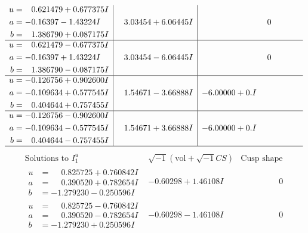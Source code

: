 \documentclass[1p]{elsarticle_modified}
\theoremstyle{definition}
\newcommand{\I}{\sqrt{-1}}
\begin{document}
$$\begin{array}{c|c|c}
\begin{aligned}
u &= \phantom{-}0.621479 + 0.677375 I \\
a &= -0.16397 - 1.43224 I \\
b &= \phantom{-}1.386790 + 0.087175 I\end{aligned}
 & \phantom{-}3.03454 + 6.06445 I & \phantom{-0.000000 } 0 \\ \hline\begin{aligned}
u &= \phantom{-}0.621479 - 0.677375 I \\
a &= -0.16397 + 1.43224 I \\
b &= \phantom{-}1.386790 - 0.087175 I\end{aligned}
 & \phantom{-}3.03454 - 6.06445 I & \phantom{-0.000000 } 0 \\ \hline\begin{aligned}
u &= -0.126756 + 0.902600 I \\
a &= -0.109634 + 0.577545 I \\
b &= \phantom{-}0.404644 + 0.757455 I\end{aligned}
 & \phantom{-}1.54671 - 3.66888 I & -6.00000 + 0. I\phantom{ +0.000000I} \\ \hline\begin{aligned}
u &= -0.126756 - 0.902600 I \\
a &= -0.109634 - 0.577545 I \\
b &= \phantom{-}0.404644 - 0.757455 I\end{aligned}
 & \phantom{-}1.54671 + 3.66888 I & -6.00000 + 0. I\phantom{ +0.000000I}\\
 \hline 
 \end{array}$$\newpage$$\begin{array}{c|c|c}  
\text{Solutions to }I^u_{1}& \I (\text{vol} + \sqrt{-1}CS) & \text{Cusp shape}\\
 \hline 
\begin{aligned}
u &= \phantom{-}0.825725 + 0.760842 I \\
a &= \phantom{-}0.390520 + 0.782654 I \\
b &= -1.279230 - 0.250596 I\end{aligned}
 & -0.60298 + 1.46108 I & \phantom{-0.000000 } 0 \\ \hline\begin{aligned}
u &= \phantom{-}0.825725 - 0.760842 I \\
a &= \phantom{-}0.390520 - 0.782654 I \\
b &= -1.279230 + 0.250596 I\end{aligned}
 & -0.60298 - 1.46108 I & \phantom{-0.000000 } 0 \\ \hline\begin{aligned}

\end{aligned}
\end{array}$$
\end{document}
